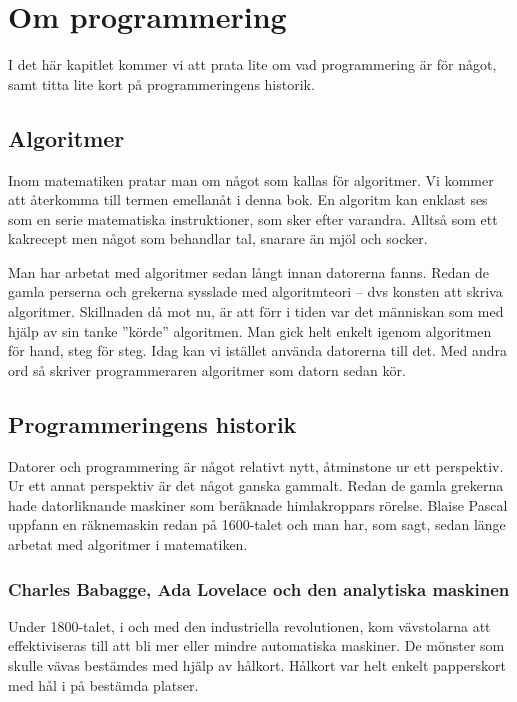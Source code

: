 %
%
\chapter{Om programmering}\label{ch:omprog}
I det här kapitlet kommer vi att prata lite om vad programmering är för något, samt titta lite kort på programmeringens historik.

\section{Algoritmer}\label{subsec:algoritmer1}
Inom matematiken pratar man om något som kallas för algoritmer. Vi kommer att återkomma till termen emellanåt i denna bok. En algoritm kan enklast ses som en serie matematiska instruktioner, som sker efter varandra. Alltså som ett kakrecept men något som behandlar tal, snarare än mjöl och socker.

Man har arbetat med algoritmer sedan långt innan datorerna fanns. Redan de gamla perserna och grekerna sysslade med algoritmteori – dvs konsten att skriva algoritmer. Skillnaden då mot nu, är att förr i tiden var det människan som med hjälp av sin tanke ''körde'' algoritmen. Man gick helt enkelt igenom algoritmen för hand, steg för steg. Idag kan vi istället använda datorerna till det. Med andra ord så skriver programmeraren algoritmer som datorn sedan kör.

\section{Programmeringens historik}
Datorer och programmering är något relativt nytt, åtminstone ur ett perspektiv. Ur ett annat perspektiv är det något ganska gammalt. Redan de gamla grekerna hade datorliknande maskiner som beräknade himlakroppars rörelse. Blaise Pascal uppfann en räknemaskin redan på 1600-talet och man har, som sagt, sedan länge arbetat med algoritmer i matematiken.

\subsection{Charles Babagge, Ada Lovelace och den analytiska maskinen}
Under 1800-talet, i och med den industriella revolutionen, kom vävstolarna att effektiviseras till att bli mer eller mindre automatiska maskiner. De mönster som skulle vävas bestämdes med hjälp av hålkort. Hålkort var helt enkelt papperskort med hål i på bestämda platser.

